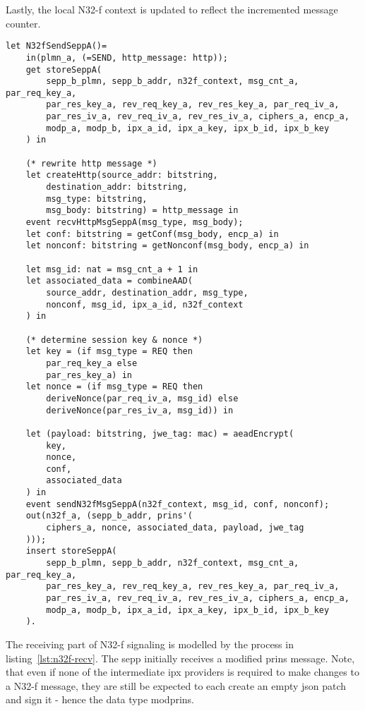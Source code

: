 Lastly, the local N32-f context is updated to reflect the incremented message counter.

\begin{lstlisting}[caption={Definition of the sending N32-f signaling transmission process},label={lst:n32f-send},firstnumber=595]
let N32fSendSeppA()=
    in(plmn_a, (=SEND, http_message: http));
    get storeSeppA(
        sepp_b_plmn, sepp_b_addr, n32f_context, msg_cnt_a, par_req_key_a,
        par_res_key_a, rev_req_key_a, rev_res_key_a, par_req_iv_a,
        par_res_iv_a, rev_req_iv_a, rev_res_iv_a, ciphers_a, encp_a,
        modp_a, modp_b, ipx_a_id, ipx_a_key, ipx_b_id, ipx_b_key
    ) in

    (* rewrite http message *)
    let createHttp(source_addr: bitstring,
        destination_addr: bitstring,
        msg_type: bitstring,
        msg_body: bitstring) = http_message in
    event recvHttpMsgSeppA(msg_type, msg_body);
    let conf: bitstring = getConf(msg_body, encp_a) in
    let nonconf: bitstring = getNonconf(msg_body, encp_a) in

    let msg_id: nat = msg_cnt_a + 1 in
    let associated_data = combineAAD(
        source_addr, destination_addr, msg_type,
        nonconf, msg_id, ipx_a_id, n32f_context
    ) in

    (* determine session key & nonce *)
    let key = (if msg_type = REQ then
        par_req_key_a else
        par_res_key_a) in
    let nonce = (if msg_type = REQ then
        deriveNonce(par_req_iv_a, msg_id) else
        deriveNonce(par_res_iv_a, msg_id)) in

    let (payload: bitstring, jwe_tag: mac) = aeadEncrypt(
        key,
        nonce,
        conf,
        associated_data
    ) in
    event sendN32fMsgSeppA(n32f_context, msg_id, conf, nonconf);
    out(n32f_a, (sepp_b_addr, prins'(
        ciphers_a, nonce, associated_data, payload, jwe_tag
    )));
    insert storeSeppA(
        sepp_b_plmn, sepp_b_addr, n32f_context, msg_cnt_a, par_req_key_a,
        par_res_key_a, rev_req_key_a, rev_res_key_a, par_req_iv_a,
        par_res_iv_a, rev_req_iv_a, rev_res_iv_a, ciphers_a, encp_a,
        modp_a, modp_b, ipx_a_id, ipx_a_key, ipx_b_id, ipx_b_key
    ).
\end{lstlisting}

The receiving part of N32-f signaling is modelled by the process in listing~\ref{lst:n32f-recv}.
The \gls{sepp} initially receives a modified \gls{prins} message.
Note, that even if none of the intermediate \gls{ipx} providers is required to make changes to a N32-f message, they are still be expected to each create an empty \gls{json} patch and sign it - hence the data type {\sffamily modprins}.

